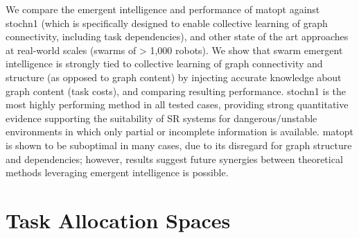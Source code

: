 We compare the emergent intelligence and performance of \gls{matopt} against \gls{stochn1}
(which is specifically designed to enable collective learning of graph connectivity,
including task dependencies), and other state of the art approaches at real-world
scales (swarms of > 1,000 robots). We show that swarm emergent intelligence is
strongly tied to collective learning of graph connectivity and structure (as opposed
to graph content) by injecting accurate knowledge about graph content (task costs),
and comparing resulting performance. \gls{stochn1} is the most highly performing method in
all tested cases, providing strong quantitative evidence supporting the suitability
of SR systems for dangerous/unstable environments in which only partial or incomplete
information is available. \gls{matopt} is shown to be suboptimal in many cases, due to its
disregard for graph structure and dependencies; however, results suggest future
synergies between theoretical methods leveraging emergent intelligence is possible.

\section{Task Allocation Spaces}\label{sec:ta-spaces}

